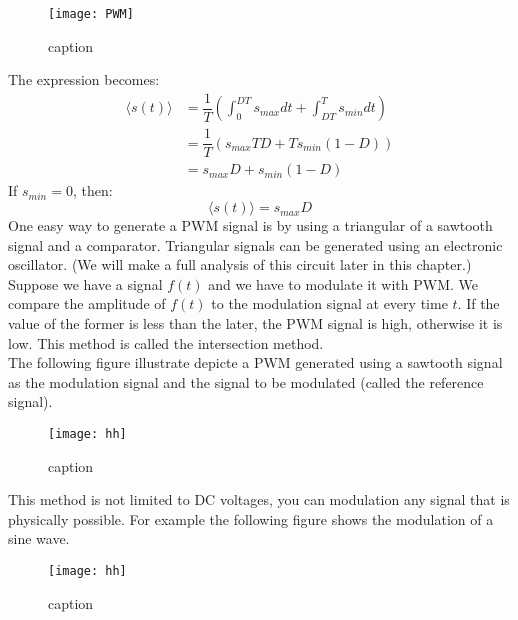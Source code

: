 \documentclass[12pt]{article}
\begin{document}
\begin{figure}[ht]
    \centering
    \texttt{[image: PWM]}
    \caption{caption}
\end{figure}
The expression becomes:
\begin{align*}
    \langle s(t)\rangle & = \dfrac{1}{T}\left(\int_{0}^{DT}s_{max}dt+\int_{DT}^{T}s_{min}dt\right) \\
                        & =\dfrac{1}{T}\left(s_{max}TD+Ts_{min}(1-D)\right)                        \\
                        & =s_{max}D+s_{min}(1-D)
\end{align*}
If $s_{min}=0$, then:
\[
    \langle s(t)\rangle=s_{max}D
\]
One easy way to generate a PWM signal is by using a triangular of a sawtooth signal and a comparator. Triangular signals can be generated using an electronic oscillator. (We will make a full analysis of this circuit later in this chapter.)\\ 
Suppose we have a signal $f(t)$ and we have to modulate it with PWM. We compare the amplitude of $f(t)$ to the modulation signal at every time $t$. If the value of the former is less than the later, the PWM signal is high, otherwise it is low. This method is called the intersection method.\\
The following figure illustrate depicte a PWM generated using a sawtooth signal as the modulation signal and the signal to be modulated (called the reference signal).\\
\begin{figure}[H]
    \centering
    \texttt{[image: hh]}
    \caption{caption}
\end{figure}
This method is not limited to DC voltages, you can modulation any signal that is physically possible. 
For example the following figure shows the modulation of a sine wave.
\begin{figure}[H]
    \centering
    \texttt{[image: hh]}
    \caption{caption}
\end{figure}
\end{document}
